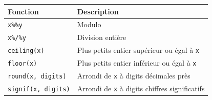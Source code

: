 \documentclass[
  11pt,
]{book}
\numberwithin{equation}{section}
\numberwithin{countremarque}{section}
\begin{document}
\begin{longtable}[]{@{}ll@{}}
\toprule
\begin{minipage}[b]{0.41\columnwidth}\raggedright
Fonction\strut
\end{minipage} & \begin{minipage}[b]{0.53\columnwidth}\raggedright
Description\strut
\end{minipage}\tabularnewline
\midrule
\endhead
\begin{minipage}[t]{0.41\columnwidth}\raggedright
\texttt{x\%\%y}\strut
\end{minipage} & \begin{minipage}[t]{0.53\columnwidth}\raggedright
Modulo\strut
\end{minipage}\tabularnewline
\begin{minipage}[t]{0.41\columnwidth}\raggedright
\texttt{x\%/\%y}\strut
\end{minipage} & \begin{minipage}[t]{0.53\columnwidth}\raggedright
Division entière\strut
\end{minipage}\tabularnewline
\begin{minipage}[t]{0.41\columnwidth}\raggedright
\texttt{ceiling(x)}\strut
\end{minipage} & \begin{minipage}[t]{0.53\columnwidth}\raggedright
Plus petits entier supérieur ou égal à \texttt{x}\strut
\end{minipage}\tabularnewline
\begin{minipage}[t]{0.41\columnwidth}\raggedright
\texttt{floor(x)}\strut
\end{minipage} & \begin{minipage}[t]{0.53\columnwidth}\raggedright
Plus petits entier inférieur ou égal à \texttt{x}\strut
\end{minipage}\tabularnewline
\begin{minipage}[t]{0.41\columnwidth}\raggedright
\texttt{round(x,\ digits)}\strut
\end{minipage} & \begin{minipage}[t]{0.53\columnwidth}\raggedright
Arrondi de \texttt{x} à digits décimales près\strut
\end{minipage}\tabularnewline
\begin{minipage}[t]{0.41\columnwidth}\raggedright
\texttt{signif(x,\ digits)}\strut
\end{minipage} & \begin{minipage}[t]{0.53\columnwidth}\raggedright
Arrondi de \texttt{x} à digits chiffres significatifs\strut

\end{minipage}
\end{longtable}
\end{document}
